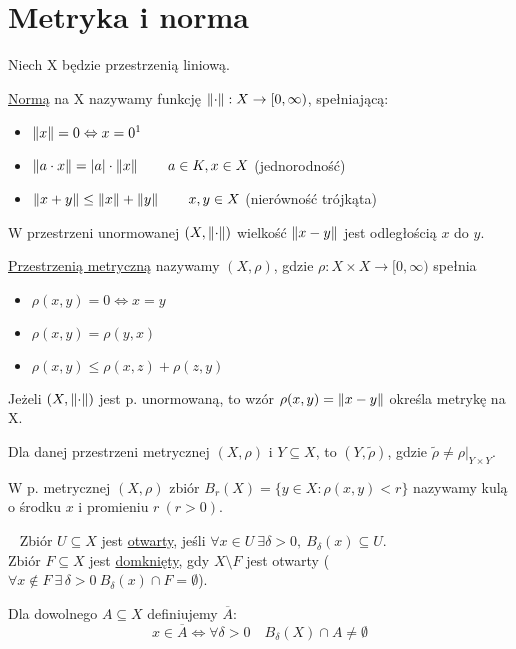 \section{Metryka i norma}
Niech X będzie przestrzenią liniową.
\begin{df} 
    \underline{Normą} na X nazywamy funkcję $\left\lVert\cdot\right\rVert: X \rightarrow [0,\infty)$, spełniającą: 
    \begin{itemize} 
        \item[(N1)] $\norm{x} = 0 \Leftrightarrow x = 0\footnotemark$
        \item[(N2)] $\left\lVert a\cdot x\right\rVert = |a| \cdot \left\lVert x\right\rVert \qquad a \in K, x \in X$ (jednorodność)
        \item[(N3)] $\left\lVert x+y\right\rVert \le \left\lVert x\right\rVert + \left\lVert y\right\rVert \qquad x,y \in X$ (nierówność trójkąta)
    \end{itemize} 
\end{df} 
\begin{uw}
    W przestrzeni unormowanej $(X,\left\lVert\cdot\right\rVert)$ wielkość $\left\lVert x-y\right\rVert$ jest odległością $x$ do $y$.
\end{uw}
\begin{df} 
    \underline{Przestrzenią metryczną} nazywamy $(X,\rho)$, gdzie $\rho: X \times X \rightarrow [0,\infty)$ spełnia
    \begin{itemize} 
        \item[(M1)] $\rho(x,y) = 0 \Leftrightarrow x = y$
        \item[(M2)] $\rho(x,y) = \rho(y,x)$
        \item[(M3)] $\rho(x,y) \le \rho(x,z)+\rho(z,y)$
    \end{itemize} 
\end{df} 
\begin{uw}
    Jeżeli $(X,\left\lVert\cdot\right\rVert)$ jest p. unormowaną, to wzór $\rho(x,y) = \left\lVert x-y\right\rVert$ określa metrykę na X.
\end{uw}

\begin{uw} 
    Dla danej przestrzeni metrycznej $(X,\rho)$ i $Y \subseteq X$, to $(Y,\widetilde\rho)$, gdzie $\widetilde\rho \neq \rho |_{Y \times Y}$.
\end{uw}
\begin{ozn}
    W p. metrycznej $(X,\rho)$ zbiór $B_r(X) = \{y \in X: \rho(x,y) < r\}$ nazywamy kulą o środku $x$ i promieniu $r \ (r > 0)$.
\end{ozn}
\begin{df} ~\newline
    Zbiór $U \subseteq X$ jest \underline{otwarty}, jeśli $\forall x \in U \ \exists \delta > 0, \ B_\delta (x) \subseteq U$. \\ 
    Zbiór $F \subseteq X$ jest \underline{domknięty}, gdy $X \setminus F$ jest otwarty ($\forall x \notin F \ \exists \, \delta > 0 \ B_\delta(x) \cap F = \emptyset$).
\end{df} 
\begin{df} 
    Dla dowolnego $A \subseteq X$ definiujemy $\overline{A}$:
    \[ x \in \overline{A} \Leftrightarrow \forall \delta > 0 \quad B_\delta(X) \cap A \neq \emptyset \]
\end{df} 

